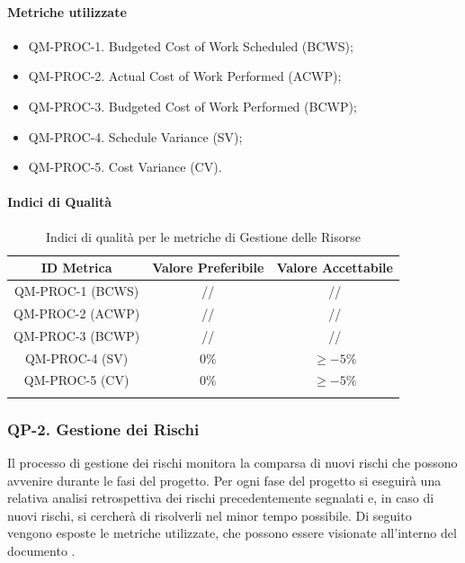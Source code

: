		\paragraph{Metriche utilizzate}

			\begin{itemize}
				\item QM-PROC-1. Budgeted Cost of Work Scheduled (BCWS);
				\item QM-PROC-2. Actual Cost of Work Performed (ACWP);
				\item QM-PROC-3. Budgeted Cost of Work Performed (BCWP);
				\item QM-PROC-4. Schedule Variance (SV);
				\item QM-PROC-5. Cost Variance (CV).
			\end{itemize}

		\paragraph{Indici di Qualità}

			\begin{center}
				\begin{longtable}{|c|c|c|}
				\hline
				\rowcolor{lighter-grayer}
				\textbf{ID Metrica} & \textbf{Valore Preferibile} & \textbf{Valore Accettabile}\\
				\hline
				\endfirsthead
				\hline
				QM-PROC-1 (BCWS) & // & // \\
				\hline
				QM-PROC-2 (ACWP) & // & // \\
				\hline
				QM-PROC-3 (BCWP) & // & // \\
				\hline
				QM-PROC-4 (SV) & \(0\%\) & \(\ge -5\%\) \\
				\hline
				QM-PROC-5 (CV) & \(0\%\) & \(\ge -5\%\) \\
				\hline
				\caption{Indici di qualità per le metriche di Gestione delle Risorse}
				\end{longtable}
			\end{center}

	\subsubsection{QP-2. Gestione dei Rischi}

		Il processo di gestione dei rischi monitora la comparsa di nuovi rischi che possono avvenire durante le fasi del progetto.
		Per ogni fase del progetto si eseguirà una relativa analisi retrospettiva dei rischi precedentemente segnalati e, in caso di nuovi rischi, si cercherà di risolverli nel minor tempo possibile.
		Di seguito vengono esposte le metriche utilizzate, che possono essere visionate all'interno del documento .

